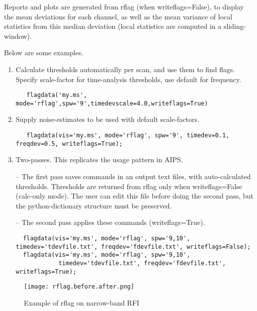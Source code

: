 Reports and plots are generated from rflag (when writeflags=False), to display
the mean deviations for each channel, as well as the mean variance of 
local statistics from this median deviation (local statistics are computed in a 
sliding-window). 


Below are some examples. 

\begin{enumerate}

\item Calculate thresholds automatically per scan, and use them to find flags.
                             Specify scale-factor for time-analysis thresholds, use default for frequency.

\begin{verbatim}
   flagdata('my.ms', mode='rflag',spw='9',timedevscale=4.0,writeflags=True)
\end{verbatim}
 
\item  Supply noise-estimates to be used with default scale-factors. 
  
\begin{verbatim}
   flagdata(vis='my.ms', mode='rflag', spw='9', timedev=0.1, freqdev=0.5, writeflags=True);
\end{verbatim}

\item Two-passes. This replicates the usage pattern in AIPS.

                             -- The first pass saves commands in an output text files, with auto-calculated thresholds.
                                Thresholds are returned from rflag only when writeflags=False (calc-only mode). 
                                The user can edit this file before doing the second pass, but the python-dictionary 
                                 structure must be preserved.

                             -- The second pass applies these commands (writeflags=True).

\begin{verbatim}
  flagdata(vis='my.ms', mode='rflag', spw='9,10', timedev='tdevfile.txt', freqdev='fdevfile.txt', writeflags=False);
  flagdata(vis='my.ms', mode='rflag', spw='9,10', 
            timedev='tdevfile.txt', freqdev='fdevfile.txt', writeflags=True);
\end{verbatim}
            
\end{enumerate} 


\begin{figure}
\texttt{[image: rflag.before.after.png]}
\caption{Example of rflag on narrow-band RFI}
\end{figure}

